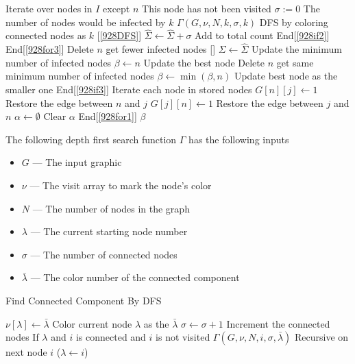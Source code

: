 \begin{algorithm}[H]
\begin{algorithmic}[1]
 \Comment Iterate over nodes in $I$ except $n$ \label{928for3}
 \Comment This node has not been visited \label{928if2}
\State $\sigma := 0$ \Comment The number of nodes would be infected by $k$
\State $\Gamma(G, \nu, N, k, \sigma, k)$ \Comment DFS by coloring connected nodes as $k$ [\ref{928DFS}]
\State $\hat{\Sigma} \gets \hat{\Sigma} + \sigma$ \Comment Add to total count
\EndIf \Comment End[\ref{928if2}]
\EndFor \Comment End[\ref{928for3}]
\If{$\hat{\Sigma} < \Sigma $} \Comment Delete $n$ get fewer infected nodes [\label{928if3}]
\State $\Sigma \gets \hat{\Sigma}$ \Comment Update the minimum number of infected nodes
\State $\beta \gets n$ \Comment Update the best node
\ElsIf{$\hat{\Sigma} < \Sigma $} \Comment Delete $n$ get same minimum number of infected nodes
\State $\beta \gets \min(\beta, n)$ \Comment Update best node as the smaller one
\EndIf \Comment End[\ref{928if3}]
 \Comment Iterate each node in stored nodes
\State $G[n][j] \gets 1$ \Comment Restore the edge between $n$ and $j$
\State $G[j][n] \gets 1$ \Comment Restore the edge between $j$ and $n$
\EndFor 
\State $\alpha \gets \emptyset$ \Comment Clear $\alpha$
\EndFor \Comment End[\ref{928for1}]
\State \Return $\beta$
\EndProcedure
\end{algorithmic}
\end{algorithm}

The following depth first search function $\Gamma$ has the following inputs
\begin{itemize}
    \item $G$ --- The input graphic
    \item $\nu$ --- The visit array to mark the node's color
    \item $N$ --- The number of nodes in the graph
    \item $\lambda$ --- The current starting node number
    \item $\sigma$ --- The number of connected nodes
    \item $\bar{\lambda}$ --- The color number of the connected component
\end{itemize}
\begin{algorithm}[H]
\caption{Find Connected Component By DFS}
\label{928DFS}
\begin{algorithmic}[1]
\State $\nu[\lambda] \gets \bar{\lambda}$ \Comment Color current node $\lambda$ as the $\bar{\lambda}$
\State $\sigma \gets \sigma + 1$ \Comment Increment the connected nodes
 \Comment If $\lambda$ and $i$ is connected and $i$ is not visited
\State $\Gamma(G, \nu, N, i, \sigma, \bar{\lambda})$ \Comment Recursive on next node $i$ ($\lambda \gets i$)
\EndIf
\EndFor
\EndFunction
\end{algorithmic}
\end{algorithm}

